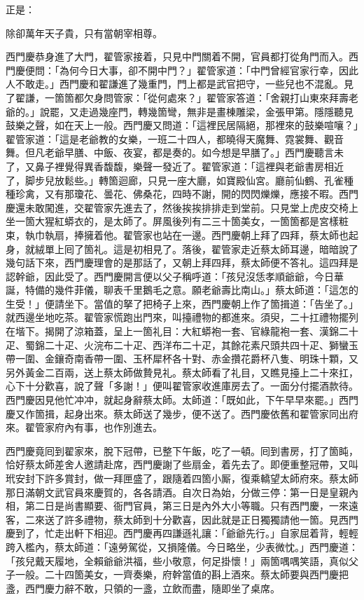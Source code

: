 正是：

\begin{myquote}
除卻萬年天子貴，只有當朝宰相尊。
\end{myquote}

西門慶恭身進了大門，翟管家接着，只見中門關着不開，{}官員都打從角門而入。西門慶便問：「為何今日大事，卻不開中門？」翟管家道：「中門曾經官家行幸，因此人不敢走。」西門慶和翟謙進了幾重門，門上都是武官把守，一些兒也不混亂。見了翟謙，一箇箇都欠身問管家：「從何處來？」翟管家答道：「舍親打山東來拜壽老爺的。」說罷，又走過幾座門，轉幾箇彎，無非是畫棟雕梁，金張甲第。隱隱聽見鼓樂之聲，如在天上一般。西門慶又問道：「這裡民居隔絕，那裡來的鼓樂喧嚷？」翟管家道：「這是老爺教的女樂，一班二十四人，都曉得天魔舞、霓裳舞、觀音舞。但凡老爺早膳、中飯、夜宴，都是奏的。如今想是早膳了。」{}西門慶聽言未了，又鼻子裡覺得異香馥馥，樂聲一發近了。翟管家道：「這裡與老爺書房相近了，脚步兒放鬆些。」轉箇迴廊，只見一座大廳，如寶殿仙宮。廳前仙鶴、孔雀種種珍禽，又有那瓊花、曇花、佛桑花，四時不謝，開的閃閃爍爍，應接不暇。西門慶還未敢闖進，交翟管家先進去了，然後挨挨排排走到堂前。只見堂上虎皮交椅上坐一箇大猩紅蟒衣的，是太師了。屏風後列有二三十箇美女，一箇箇都是宮樣粧束，執巾執扇，捧擁着他。翟管家也站在一邊。西門慶朝上拜了四拜，蔡太師也起身，就絨單上囘了箇礼。這是初相見了。落後，翟管家走近蔡太師耳邊，暗暗說了幾句話下來，西門慶理會的是那話了，又朝上拜四拜，蔡太師便不答礼。這四拜是認幹爺，因此受了。{}西門慶開言便以父子稱呼道：「孩兒沒恁孝順爺爺，今日華誕，特備的幾件菲儀，聊表千里鵝毛之意。願老爺壽比南山。」蔡太師道：「這怎的生受！」便請坐下。當值的拏了把椅子上來，西門慶朝上作了箇揖道：「告坐了。」就西邊坐地吃茶。翟管家慌跑出門來，叫擡禮物的都進來。須臾，二十扛禮物擺列在堦下。揭開了涼箱蓋，呈上一箇礼目：大紅蟒袍一套、官綠龍袍一套、漢錦二十疋、蜀錦二十疋、火浣布二十疋、西洋布二十疋，其餘花素尺頭共四十疋、獅蠻玉帶一圍、金鑲奇南香帶一圍、玉杯犀杯各十對、赤金攢花爵杯八隻、明珠十顆，又另外黃金二百兩，送上蔡太師做贄見礼。蔡太師看了礼目，又瞧見擡上二十來扛，心下十分歡喜，說了聲「多謝！」便叫翟管家收進庫房去了。一面分付擺酒款待。西門慶因見他忙冲冲，就起身辭蔡太師。太師道：「既如此，下午早早來罷。」西門慶又作箇揖，起身出來。蔡太師送了幾步，便不送了。{}西門慶依舊和翟管家同出府來。翟管家府內有事，也作別進去。

西門慶竟囘到翟家來，脫下冠帶，已整下午飯，吃了一頓。囘到書房，打了箇盹，恰好蔡太師差舍人邀請赴席，西門慶謝了些扇金，着先去了。即便重整冠帶，又叫玳安封下許多賞封，做一拜匣盛了，跟隨着四箇小厮，復乘轎望太師府來。蔡太師那日滿朝文武官員來慶賀的，各各請酒。自次日為始，分做三停：第一日是皇親內相，第二日是尚書顯要、衙門官員，第三日是內外大小等職。只有西門慶，一來遠客，二來送了許多禮物，蔡太師到十分歡喜，因此就是正日獨獨請他一箇。見西門慶到了，忙走出軒下相迎。西門慶再四謙遜礼讓：「爺爺先行。」自家屈着背，輕輕跨入檻內，蔡太師道：「遠勞駕從，又損隆儀。今日略坐，少表微忱。」西門慶道：「孩兒戴天履地，全賴爺爺洪福，些小敬意，何足掛懷！」兩箇喁喁笑語，真似父子一般。{}二十四箇美女，一齊奏樂，府幹當值的斟上酒來。蔡太師要與西門慶把盞，西門慶力辭不敢，只領的一盞，立飲而盡，隨即坐了桌席。

